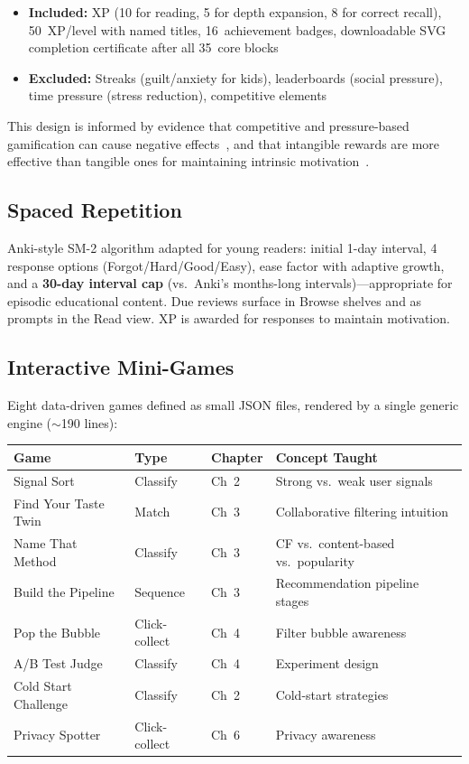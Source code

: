 \documentclass[11pt,a4paper]{article}
\begin{document}
\begin{itemize}
  \item \textbf{Included:} XP (10 for reading, 5 for depth expansion, 8 for correct recall), 50~XP/level with named titles, 16~achievement badges, downloadable SVG completion certificate after all 35~core blocks
  \item \textbf{Excluded:} Streaks (guilt/anxiety for kids), leaderboards (social pressure), time pressure (stress reduction), competitive elements
\end{itemize}

This design is informed by evidence that competitive and pressure-based gamification can cause negative effects~\cite{almeida2022}, and that intangible rewards are more effective than tangible ones for maintaining intrinsic motivation~\cite{xiao2023}.

\subsection{Spaced Repetition}

Anki-style SM-2 algorithm adapted for young readers: initial 1-day interval, 4 response options (Forgot/Hard/Good/Easy), ease factor with adaptive growth, and a \textbf{30-day interval cap} (vs.\ Anki's months-long intervals)---appropriate for episodic educational content. Due reviews surface in Browse shelves and as prompts in the Read view. XP is awarded for responses to maintain motivation.

\subsection{Interactive Mini-Games}

Eight data-driven games defined as small JSON files, rendered by a single generic engine ($\sim$190 lines):

\begin{center}
\small
\begin{tabular}{@{}llll@{}}
\toprule
Game & Type & Chapter & Concept Taught \\
\midrule
Signal Sort & Classify & Ch~2 & Strong vs.\ weak user signals \\
Find Your Taste Twin & Match & Ch~3 & Collaborative filtering intuition \\
Name That Method & Classify & Ch~3 & CF vs.\ content-based vs.\ popularity \\
Build the Pipeline & Sequence & Ch~3 & Recommendation pipeline stages \\
Pop the Bubble & Click-collect & Ch~4 & Filter bubble awareness \\
A/B Test Judge & Classify & Ch~4 & Experiment design \\
Cold Start Challenge & Classify & Ch~2 & Cold-start strategies \\
Privacy Spotter & Click-collect & Ch~6 & Privacy awareness \\
\bottomrule
\end{tabular}
\end{center}
\end{document}
